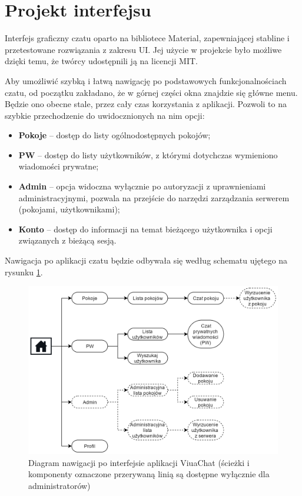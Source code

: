 \section{Projekt interfejsu}

Interfejs graficzny czatu oparto na bibliotece Material, zapewniającej stabline
i przetestowane rozwiązania z zakresu UI. Jej użycie w projekcie było możliwe dzięki
temu, że twórcy udostępnili ją na licencji MIT.

Aby umożliwić szybką i łatwą nawigację po podstawowych funkcjonalnościach czatu,
od początku zakładano, że w górnej części okna znajdzie się główne menu. Będzie
ono obecne stale, przez cały czas korzystania z aplikacji. Pozwoli to na szybkie
przechodzenie do uwidocznionych na nim opcji:

\begin{itemize}
	\item \textbf{Pokoje} -- dostęp do listy ogólnodostępnych pokojów;
	\item \textbf{PW} -- dostęp do listy użytkowników, z którymi dotychczas
	wymieniono wiadomości prywatne;
	\item \textbf{Admin} -- opcja widoczna wyłącznie po autoryzacji z uprawnieniami
	administracyjnymi, pozwala na przejście do narzędzi zarządzania serwerem
	(pokojami, użytkownikami);
	\item \textbf{Konto} -- dostęp do informacji na temat bieżącego użytkownika i
	opcji związanych z bieżącą sesją.
\end{itemize}

Nawigacja po aplikacji czatu będzie odbywała się według schematu ujętego na
rysunku \ref{nav-diag}.

\begin{figure}[!htp]
	\centering
	\includegraphics[width=\textwidth]{chat/fig/nav-diag}
	\caption{Diagram nawigacji po interfejsie aplikacji ViuaChat (ścieżki i
	komponenty oznaczone przerywaną linią są dostępne wyłącznie dla administratorów)}
	\label{nav-diag}
\end{figure}

